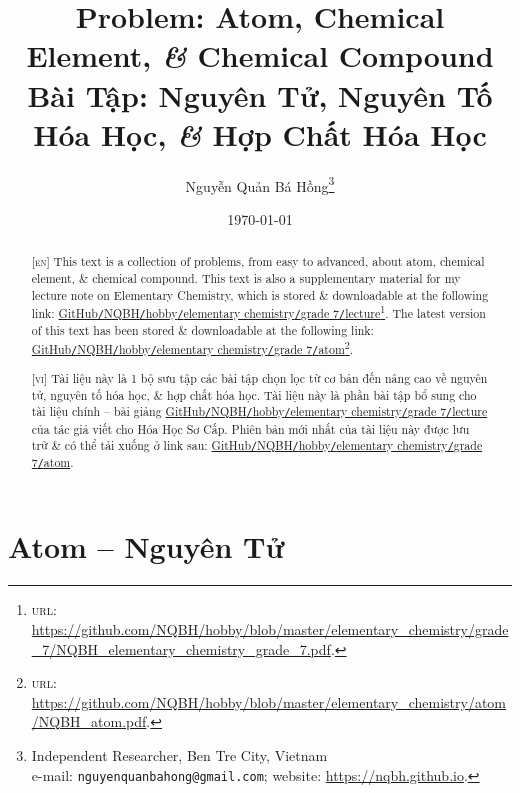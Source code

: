 \documentclass{article}
\title{Problem: Atom, Chemical Element, \textit{\&} Chemical Compound\\Bài Tập: Nguyên Tử, Nguyên Tố Hóa Học, \textit{\&} Hợp Chất Hóa Học}
\author{Nguyễn Quản Bá Hồng\footnote{Independent Researcher, Ben Tre City, Vietnam\\e-mail: \texttt{nguyenquanbahong@gmail.com}; website: \url{https://nqbh.github.io}.}}
\date{\today}
\begin{document}
\maketitle
\begin{abstract}
	\textsc{[en]} This text is a collection of problems, from easy to advanced, about atom, chemical element, \& chemical compound. This text is also a supplementary material for my lecture note on Elementary Chemistry, which is stored \& downloadable at the following link: \href{https://github.com/NQBH/hobby/blob/master/elementary_chemistry/grade_7/NQBH_elementary_chemistry_grade_7.pdf}{GitHub\texttt{/}NQBH\texttt{/}hobby\texttt{/}elementary chemistry\texttt{/}grade 7\texttt{/}lecture}\footnote{\textsc{url}: \url{https://github.com/NQBH/hobby/blob/master/elementary_chemistry/grade_7/NQBH_elementary_chemistry_grade_7.pdf}.}. The latest version of this text has been stored \& downloadable at the following link: \href{https://github.com/NQBH/hobby/blob/master/elementary_chemistry/chemical_reaction/NQBH_chemical_reaction.pdf}{GitHub\texttt{/}NQBH\texttt{/}hobby\texttt{/}elementary chemistry\texttt{/}grade 7\texttt{/}atom}\footnote{\textsc{url}: \url{https://github.com/NQBH/hobby/blob/master/elementary_chemistry/atom/NQBH_atom.pdf}.}.
	\vspace{2mm}
	
	\textsc{[vi]} Tài liệu này là 1 bộ sưu tập các bài tập chọn lọc từ cơ bản đến nâng cao về nguyên tử, nguyên tố hóa học, \& hợp chất hóa học. Tài liệu này là phần bài tập bổ sung cho tài liệu chính -- bài giảng \href{https://github.com/NQBH/hobby/blob/master/elementary_chemistry/grade_7/NQBH_elementary_chemistry_grade_7.pdf}{GitHub\texttt{/}NQBH\texttt{/}hobby\texttt{/}elementary chemistry\texttt{/}grade 7\texttt{/}lecture} của tác giả viết cho Hóa Học Sơ Cấp. Phiên bản mới nhất của tài liệu này được lưu trữ \& có thể tải xuống ở link sau: \href{https://github.com/NQBH/hobby/blob/master/elementary_chemistry/grade_7/real/NQBH_real.pdf}{GitHub\texttt{/}NQBH\texttt{/}hobby\texttt{/}elementary chemistry\texttt{/}grade 7\texttt{/}atom}.
\end{abstract}
\setcounter{secnumdepth}{4}
\setcounter{tocdepth}{3}
\tableofcontents
\newpage


\section{Atom -- Nguyên Tử}
\end{document}
